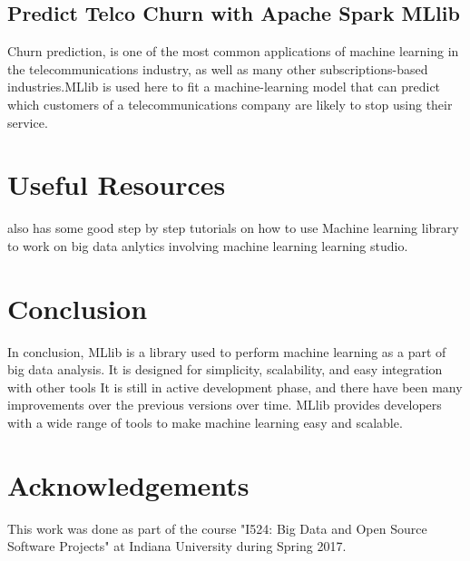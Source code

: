 \documentclass[9pt,twocolumn,twoside]{../../styles/osajnl}
\begin{document}
\subsection{Predict Telco Churn with Apache Spark MLlib}

Churn prediction\cite{www-churnprediction}, is one of the most common
applications of machine learning in the telecommunications industry,
as well as many other subscriptions-based industries.MLlib is used
here to fit a machine-learning model that can predict which customers
of a telecommunications company are likely to stop using their
service.\cite{TelcoChurn}

\section{Useful Resources}

\cite{www-mllib-guide} also
has some good step by step tutorials on how to use Machine learning
library to work on big data anlytics involving machine learning
learning studio.

\section{Conclusion}

In conclusion, MLlib is a library used to perform machine learning as
a part of big data analysis. It is designed for simplicity,
scalability, and easy integration with other tools It is still in
active development phase, and there have been many improvements over
the previous versions over time. MLlib provides developers with a wide
range of tools to make machine learning easy and scalable.

\section{Acknowledgements}

This work was done as part of the course "I524: Big Data and Open
Source Software Projects" at Indiana University during Spring
2017. 


\end{document}
